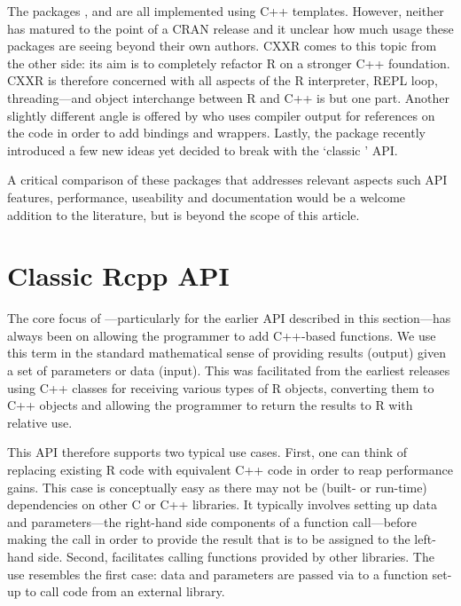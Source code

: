 The packages  \citep{liang08:rcppbind}, 
\citep{armstrong09:RAbstraction} and 
\citep{armstrong09:RObjects} are all implemented using C++ templates.
However, neither has matured to the point of a CRAN release and it
unclear how much usage these packages are seeing beyond their own authors.
%
CXXR \citep{runnalls09:cxxr} comes to this topic from the other side: 
its aim is to completely refactor R on a stronger C++ foundation. 
CXXR is therefore concerned with all aspects of the R interpreter,
REPL loop, threading---and object interchange between R and C++ is but one part.
%
Another slightly different angle is offered by
\cite{templelang09:rgcctranslationunit} who uses compiler output for
references on the code in order to add bindings and wrappers.
%
Lastly, the  package \citep{samperi09:rcpptemplate}
recently introduced a few new ideas yet decided to break with the
`classic ' API.

A critical comparison of these packages that addresses relevant aspects such
API features, performance, useability and documentation would be a welcome
addition to the literature, but is beyond the scope of this article.

\section{Classic Rcpp API}
\label{sec:classic_rcpp}

The core focus of ---particularly for the earlier API described in
this section---has always been on allowing the programmer to add C++-based
functions. We use this term in the standard mathematical sense of providing
results (output) given a set of parameters or data (input). This was
facilitated from the earliest releases using C++ classes for receiving
various types of R objects, converting them to C++ objects and allowing the
programmer to return the results to R with relative use. 

This API therefore supports two typical use cases. First, one can think of
replacing existing R code with equivalent C++ code in order to reap
performance gains.  This case is conceptually easy as there may not be
(built- or run-time) dependencies on other C or C++ libraries.  It typically
involves setting up data and parameters---the right-hand side components of a
function call---before making the call in order to provide the result that is
to be assigned to the left-hand side. Second,  facilitates calling
functions provided by other libraries. The use resembles the first case: data
and parameters are passed via  to a function set-up to call code
from an external library.  

